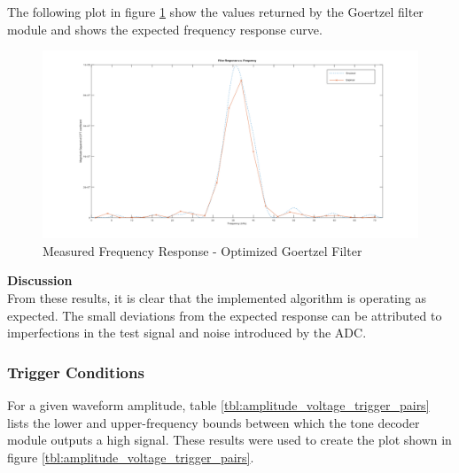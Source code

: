 The following plot in figure \ref{fig:goertzel_filter_response_empirical} show the values returned by the Goertzel filter module and shows the expected frequency response curve.

\begin{figure}[H]
	\centering
	\includegraphics[width=\linewidth]{figures/results/goertzel_filter_empirical_wide.png}
	\caption{Measured Frequency Response - Optimized Goertzel Filter}
	\label{fig:goertzel_filter_response_empirical}
\end{figure}


\textbf{Discussion}\\
From these results, it is clear that the implemented algorithm is operating as expected. The small deviations from the expected response can be attributed to imperfections in the test signal and noise introduced by the ADC.




\subsubsection{Trigger Conditions}

For a given waveform amplitude, table \ref{tbl:amplitude_voltage_trigger_pairs} lists the lower and upper-frequency bounds between which the tone decoder module outputs a high signal. These results were used to create the plot shown in figure \ref{tbl:amplitude_voltage_trigger_pairs}.

